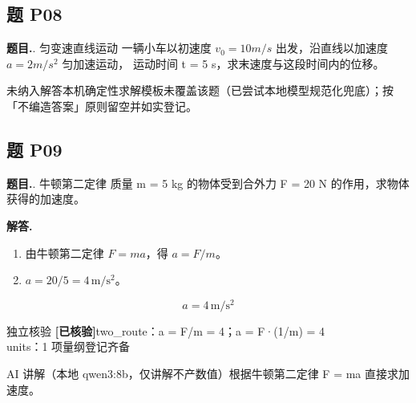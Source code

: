 \documentclass[11pt]{article}
\newcommand{\okmark}{\textcolor{okgreen}{\textbf{[已核验]}}}
\begin{document}
\subsection*{题 P08}
\noindent\textbf{题目.}. 匀变速直线运动
一辆小车以初速度 $v_0 = 10 m/s$ 出发，沿直线以加速度 $a = 2 m/s^2$ 匀加速运动，
运动时间 t = 5 s，求末速度与这段时间内的位移。\par
\begin{aibox}{未纳入解答}本机确定性求解模板未覆盖该题（已尝试本地模型规范化兜底）；按「不编造答案」原则留空并如实登记。\end{aibox}

\subsection*{题 P09}
\noindent\textbf{题目.}. 牛顿第二定律
质量 m = 5 kg 的物体受到合外力 F = 20 N 的作用，求物体获得的加速度。\par
\vspace{4pt}\noindent\textbf{解答.}\quad
\begin{enumerate}[leftmargin=1.6em,itemsep=2pt]
  \item 由牛顿第二定律 $F=ma$，得 $a=F/m$。
  \item $a=20/5=4\,\mathrm{m/s^2}$。
\end{enumerate}
\[ \boxed{a=4\,\mathrm{m/s^2}} \]
\par
\begin{veribox}{独立核验 \okmark}two\_route：a = F/m = 4；a = F·(1/m) = 4\\units：1 项量纲登记齐备\end{veribox}
\begin{aibox}{AI 讲解（本地 qwen3:8b，仅讲解不产数值）}根据牛顿第二定律 F = ma 直接求加速度。\end{aibox}
\vspace{10pt}
\end{document}

